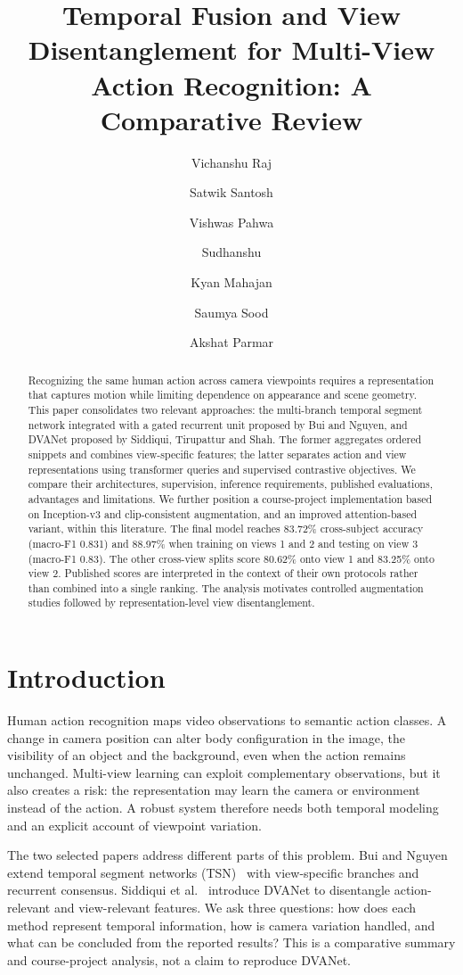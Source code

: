 \documentclass[runningheads]{llncs}
\title{Temporal Fusion and View Disentanglement for Multi-View Action Recognition: A Comparative Review}
\author{Vichanshu Raj \and Satwik Santosh \and Vishwas Pahwa \and Sudhanshu \and Kyan Mahajan \and Saumya Sood \and Akshat Parmar}
\institute{Indian Institute of Information Technology, Allahabad, India\\
\email{iit2024083@iiita.ac.in, iit2024084@iiita.ac.in, iit2024087@iiita.ac.in, iit2024081@iiita.ac.in, iit2024092@iiita.ac.in, iit2024018@iiita.ac.in, iit2024077@iiita.ac.in}}
\begin{document}
\maketitle

\begin{abstract}
Recognizing the same human action across camera viewpoints requires a representation that captures motion while limiting dependence on appearance and scene geometry. This paper consolidates two relevant approaches: the multi-branch temporal segment network integrated with a gated recurrent unit proposed by Bui and Nguyen, and DVANet proposed by Siddiqui, Tirupattur and Shah. The former aggregates ordered snippets and combines view-specific features; the latter separates action and view representations using transformer queries and supervised contrastive objectives. We compare their architectures, supervision, inference requirements, published evaluations, advantages and limitations. We further position a course-project implementation based on Inception-v3 and clip-consistent augmentation, and an improved attention-based variant, within this literature. The final model reaches 83.72\% cross-subject accuracy (macro-F1 0.831) and 88.97\% when training on views 1 and 2 and testing on view 3 (macro-F1 0.83). The other cross-view splits score 80.62\% onto view 1 and 83.25\% onto view 2. Published scores are interpreted in the context of their own protocols rather than combined into a single ranking. The analysis motivates controlled augmentation studies followed by representation-level view disentanglement.
\end{abstract}

\section{Introduction}
Human action recognition maps video observations to semantic action classes. A change in camera position can alter body configuration in the image, the visibility of an object and the background, even when the action remains unchanged. Multi-view learning can exploit complementary observations, but it also creates a risk: the representation may learn the camera or environment instead of the action. A robust system therefore needs both temporal modeling and an explicit account of viewpoint variation.

The two selected papers address different parts of this problem. Bui and Nguyen~\cite{bui} extend temporal segment networks (TSN)~\cite{tsn} with view-specific branches and recurrent consensus. Siddiqui et al.~\cite{dva} introduce DVANet to disentangle action-relevant and view-relevant features. We ask three questions: how does each method represent temporal information, how is camera variation handled, and what can be concluded from the reported results? This is a comparative summary and course-project analysis, not a claim to reproduce DVANet.
\end{document}
